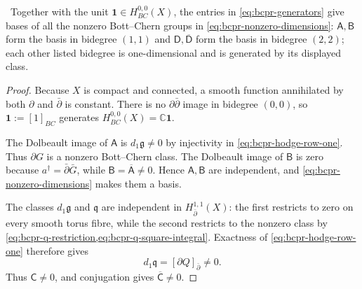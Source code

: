 \begin{proposition}
\label{prop:bcpr-generators-are-bases}
\Verified\ Together with the unit $\mathbf1\in H^{0,0}_{BC}(X)$, the entries
in \cref{eq:bcpr-generators} give bases of all the nonzero Bott--Chern groups
in \cref{eq:bcpr-nonzero-dimensions}:
$\mathsf A,\mathsf B$ form the basis in bidegree $(1,1)$ and
$\mathsf D,\overline{\mathsf D}$ form the basis in bidegree $(2,2)$;
each other listed bidegree is one-dimensional and is generated by its
displayed class.
\end{proposition}

\begin{proof}
Because $X$ is compact and connected, a smooth function annihilated by both
$\partial$ and $\bar\partial$ is constant.  There is no
$\partial\bar\partial$ image in bidegree $(0,0)$, so
$\mathbf1:=[1]_{BC}$ generates
$H^{0,0}_{BC}(X)=\mathbb C\mathbf1$.

The Dolbeault image of $\mathsf A$ is
$d_1\mathfrak g\neq0$ by injectivity in
\cref{eq:bcpr-hodge-row-one}.  Thus $\partial G$ is a nonzero
Bott--Chern class.  The Dolbeault image of $\mathsf B$ is zero because
$a^\dagger=\bar\partial\bar G$, while
$\mathsf B=\overline{\mathsf A}\neq0$.  Hence
$\mathsf A,\mathsf B$ are independent, and
\cref{eq:bcpr-nonzero-dimensions} makes them a basis.

The classes $d_1\mathfrak g$ and $\mathfrak q$ are independent in
$H^{1,1}_{\bar\partial}(X)$: the first restricts to zero on every smooth
torus fibre, while the second restricts to the nonzero class
by \cref{eq:bcpr-q-restriction,eq:bcpr-q-square-integral}.  Exactness of
\cref{eq:bcpr-hodge-row-one} therefore gives
\begin{equation}
 d_1\mathfrak q=[\partial Q]_{\bar\partial}\neq0.
\label{eq:bcpr-c-nonzero}
\end{equation}
Thus $\mathsf C\neq0$, and conjugation gives
$\overline{\mathsf C}\neq0$.


\end{proof}
